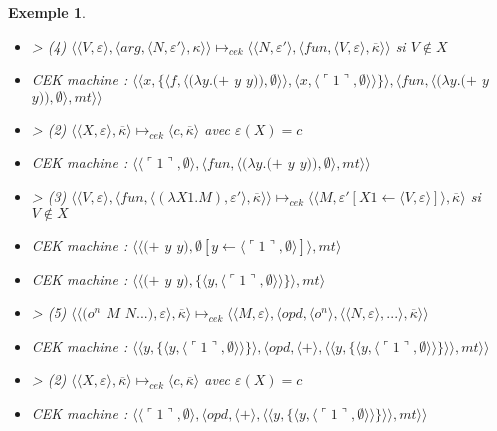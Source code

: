 \documentclass[10pt,a4paper]{report}
\newtheorem{ex}{Exemple}
\begin{document}
\begin{ex}
\begin{itemize}
			\item[] > (4) $\langle \langle V,\varepsilon\rangle,\langle arg,\langle N,\varepsilon'\rangle,\kappa\rangle\rangle \longmapsto_{cek} \langle \langle N,\varepsilon'\rangle,\langle fun,\langle V,\varepsilon\rangle,\overline{\kappa}\rangle\rangle$ si $V \notin X$
			\item[] CEK machine : $\langle\langle x,\{\langle f,\langle(\lambda y.(+$ $y$ $y)),\emptyset\rangle\rangle,\langle x,\langle\ulcorner 1\urcorner,\emptyset\rangle\rangle\}\rangle,\langle fun,\langle(\lambda y.(+$ $y$ $y)),\emptyset\rangle,mt\rangle\rangle$	
			\item[] > (2) $\langle\langle X,\varepsilon\rangle,\overline{\kappa}\rangle \longmapsto_{cek} \langle c,\overline{\kappa}\rangle$ avec $\varepsilon(X) = c$
			\item[] CEK machine : $\langle \langle\ulcorner 1\urcorner,\emptyset\rangle,\langle fun,\langle(\lambda y.(+$ $y$ $y)),\emptyset\rangle,mt\rangle\rangle$	
			\item[] > (3) $\langle\langle V,\varepsilon\rangle,\langle fun,\langle (\lambda X1.M),\varepsilon'\rangle,\overline{\kappa} \rangle \rangle \longmapsto_{cek} \langle \langle M,\varepsilon'[X1 \leftarrow \langle V,\varepsilon\rangle]\rangle,\overline{\kappa}\rangle$ si $V \notin X$
			\item[] CEK machine : $\langle\langle(+$ $y$ $y),\emptyset[y \leftarrow\langle\ulcorner 1\urcorner,\emptyset\rangle]\rangle ,mt\rangle$
			\item[] CEK machine : $\langle\langle(+$ $y$ $y),\{\langle y,\langle\ulcorner 1\urcorner,\emptyset\rangle\rangle\}\rangle ,mt\rangle$
			\item[] > (5) $\langle\langle(o^{n}$ $M$ $N...),\varepsilon\rangle,\overline{\kappa}\rangle \longmapsto_{cek} \langle \langle M,\varepsilon\rangle,\langle opd,\langle o^{n}\rangle,\langle \langle N,\varepsilon\rangle,...\rangle,\overline{\kappa}\rangle\rangle$
			\item[] CEK machine : $\langle\langle y,\{\langle y,\langle\ulcorner 1\urcorner,\emptyset\rangle\rangle\}\rangle ,\langle opd,\langle+\rangle,\langle\langle y,\{\langle y,\langle\ulcorner 1\urcorner,\emptyset\rangle\rangle\}\rangle\rangle,mt\rangle\rangle$
			\item[] > (2) $\langle\langle X,\varepsilon\rangle,\overline{\kappa}\rangle \longmapsto_{cek} \langle c,\overline{\kappa}\rangle$ avec $\varepsilon(X) = c$
			\item[] CEK machine : $\langle\langle\ulcorner 1\urcorner,\emptyset\rangle,\langle opd,\langle+\rangle,\langle\langle y,\{\langle y,\langle\ulcorner 1\urcorner,\emptyset\rangle\rangle\}\rangle\rangle,mt\rangle\rangle$

\end{itemize}
\end{ex}
\end{document}
